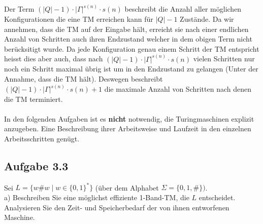 Der Term $(\left| Q\right| -1) \cdot \left| \Gamma\right|^{s(n)} \cdot s(n)$ beschreibt die Anzahl aller möglichen Konfigurationen
die eine TM erreichen kann für $|Q| - 1$ Zustände. Da wir 
annehmen, dass die TM auf der Eingabe hält, erreicht sie nach 
einer endlichen Anzahl von Schritten auch ihren Endzustand
welcher in dem obigen Term nicht berücksitigt wurde. Da jede
Konfiguration genau einem Schritt der TM entspricht heisst dies
aber auch, dass nach $(\left| Q\right| -1) \cdot \left| \Gamma\right|^{s(n)} \cdot s(n)$ vielen Schritten nur noch ein Schritt
maximal übrig ist um in den Endzustand zu gelangen (Unter der
Annahme, dass die TM hält). Deswegen beschreibt 
$(\left| Q\right| -1) \cdot \left| \Gamma\right|^{s(n)} \cdot s(n)+1$ die maximale Anzahl von Schritten nach denen die TM terminiert.
\\\\


In den folgenden Aufgaben ist es \textbf{nicht} notwendig, die Turingmaschinen explizit anzugeben. Eine Beschreibung ihrer Arbeitsweise und Laufzeit in den einzelnen Arbeitsschritten genügt.

\subsection*{Aufgabe 3.3}
Sei $L=\{w\#w \mid w \in \{0,1\}^*\}$ (über dem Alphabet $\Sigma = \{0,1,\#\})$.\\
a) Beschreiben Sie eine möglichst effiziente 1-Band-TM, die $L$ entscheidet. Analysieren Sie den Zeit- und Speicherbedarf der von ihnen entworfenen Maschine.\\

